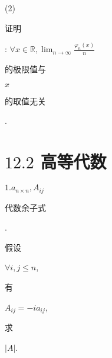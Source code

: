 \documentclass[10pt]{article}
\begin{document}
(2) \begin{CJK}{UTF8}{mj}证明\end{CJK}: $\forall x \in \mathbb{R}, \lim _{n \rightarrow \infty} \frac{\varphi_{n}(x)}{n}$ \begin{CJK}{UTF8}{mj}的极限值与\end{CJK} $x$ \begin{CJK}{UTF8}{mj}的取值无关\end{CJK}.

\section{$12.2$ 高等代数}
$1 . a_{n \times n}, A_{i j}$ \begin{CJK}{UTF8}{mj}代数余子式\end{CJK}. \begin{CJK}{UTF8}{mj}假设\end{CJK} $\forall i, j \leq n$, \begin{CJK}{UTF8}{mj}有\end{CJK} $A_{i j}=-i a_{i j}$, \begin{CJK}{UTF8}{mj}求\end{CJK} $|A|$.
\end{document}
